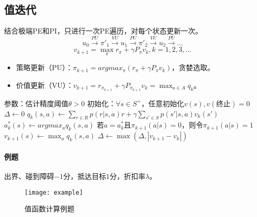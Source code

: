 \documentclass[
12pt, %
a4paper, 
oneside, %
headinclude,footinclude, %
]{scrartcl}
\begin{document}
\subsection[值迭代]{值迭代}
结合极端PE和PI，只进行一次PE遍历，对每个状态更新一次。
$$ u_0 \xrightarrow{PU} \pi'_1 \xrightarrow{VU} u_1 \xrightarrow{PU} \pi'_2 \xrightarrow{VU} u_2 \xrightarrow{PU} \dots $$
$$ v_{k + 1} = \max_{\pi} r_{\pi} + \gamma P_{\pi}v_k, k = 1, 2, 3, \dots $$
\begin{itemize}
\item 策略更新（PU）：$ \pi_{k + 1} = argmax_{\pi}(r_{\pi} + \gamma P_{\pi}v_k) $，贪婪选取。
\item 价值更新（VU）：$ v_{k + 1} = r_{\pi_{k + 1}} + \gamma P_{\pi_{k + 1}}v_k = \max_{a \in A} q_k $。
\end{itemize}
\begin{myalgorithm}[值迭代]
\State 参数：估计精度阈值$ \theta > 0 $
\State 初始化：$ \forall s \in S^+ $，任意初始化$ v(s), v(\text{终止}) = 0 $
\Repeat
\State $ \Delta \gets 0 $
\State $ q_k(s, a) \gets \sum_{r \in R} p(r|s, a)r + \gamma \sum_{s' \in S} p(s'|s, a)v_k(s') $
\State $ a^*_k(s) \gets argmax_a q_k(s, a) $ 
\State 若$ a = a^*_k $且$ \pi_{k + 1}(a|s) = 0 $，则令$ \pi_{k + 1}(a|s) = 1 $ 
\State $ v_{k + 1}(s) \gets \max_a q_k(s, a) $ 
\State $ \Delta \gets \max(\Delta, |v_{k + 1} - v_k|) $ 
\EndFor
\EndFor
\Until{$ \Delta < \theta $}
\end{myalgorithm}
\paragraph{例题}
出界、碰到障碍$ -1 $分，抵达目标$ 1 $分，折扣率$ \lambda $。
\begin{figure}[H]
\centering 
\texttt{[image: example]} 
\caption{值函数计算例题}
\end{figure}
\end{document}
